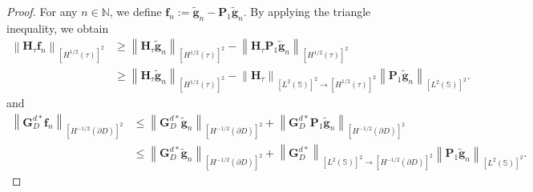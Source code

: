 \documentclass[10pt,a4paper]{amsart}
\begin{document}
\begin{proof}
For any $n \in \mathbb{N}$, we define $\mathbf{f}_n := \tilde{\mathbf{g}}_n - \mathbf{P}_1 \tilde{\mathbf{g}}_n$. By applying the triangle inequality, we obtain
\begin{equation}\begin{aligned}\label{eq:HInequality}
	    \left\| \mathbf H_{\tau} \mathbf f_n \right\|_{\left[H^{1/2}\left(\tau \right) \right]^2 }
		&\geq \left\| \mathbf H_{\tau} \tilde{\mathbf g}_n \right\|_{\left[H^{1/2}\left(\tau \right) \right]^2 } - \left\| \mathbf H_{\tau} \mathbf P_1 \tilde{\mathbf g}_n \right\|_{\left[H^{1/2}\left(\tau \right) \right]^2 }\\
		&\geq \left\| \mathbf H_{\tau} \tilde{\mathbf g}_n \right\|_{\left[H^{1/2}\left(\tau \right) \right]^2 } - \left\| \mathbf H_{\tau} \right\|_{ \left[L^{2}\left(\mathbb S \right) \right]^2 \to \left[H^{1/2} \left(\tau \right) \right] ^2 } \left\|\mathbf P_1 \tilde{\mathbf g}_n \right\|_{\left[L^{2} \left(\mathbb S \right) \right] ^2}.
\end{aligned}\end{equation}
and
\begin{equation}\begin{aligned}\label{eq:GInequality}
		\left\| \mathbf G_D^{d*} \mathbf f_n \right\|_{\left[H^{-1/2}\left(\partial D \right) \right]^2 }
		&\leq \left\| \mathbf G_D^{d*} \tilde{\mathbf g }_n\right\|_{\left[H^{-1/2}\left(\partial D \right) \right]^2 }+ \left\| \mathbf G_D^{d*} \mathbf P_1 \tilde{\mathbf g }_n\right\|_{\left[H^{-1/2}\left(\partial D \right) \right]^2 } \\
		&\leq \left\| \mathbf G_D^{d*} \tilde{\mathbf g }_n\right\|_{\left[H^{-1/2}\left(\partial D \right) \right]^2 }+ \left\| \mathbf G_D^{d*}\right\|_{\left[L^{2} \left(\mathbb S \right) \right] ^2 \to \left[H^{-1/2}\left(\partial D \right) \right]^2} \left\|\mathbf P_1 \tilde{\mathbf g }_n\right\|_{\left[L^{2} \left(\mathbb S \right) \right] ^2}.
\end{aligned}\end{equation}


\end{proof}
\end{document}
